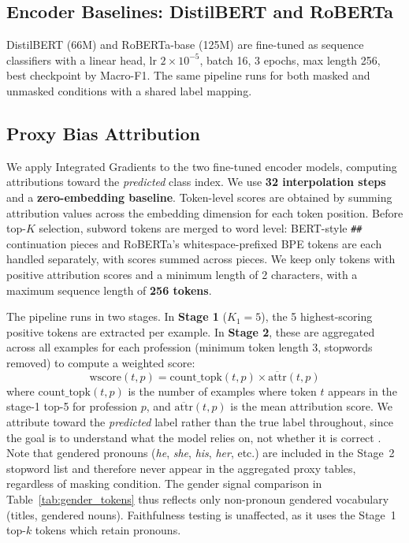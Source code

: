 \documentclass[11pt]{article}
\begin{document}
\subsection{Encoder Baselines: DistilBERT and RoBERTa}
DistilBERT \citep{sanh2019distilbert} (66M) and RoBERTa-base
\citep{liu2019roberta} (125M) are fine-tuned as sequence classifiers
with a linear head, lr $2\!\times\!10^{-5}$, batch 16, 3 epochs,
max length 256, best checkpoint by Macro-F1. The same pipeline runs
for both masked and unmasked conditions with a shared label mapping.

\subsection{Proxy Bias Attribution}
We apply Integrated Gradients \citep{sundararajan2017axiomatic} to the
two fine-tuned encoder models, computing attributions toward the
\emph{predicted} class index.
We use \textbf{32 interpolation steps} and a \textbf{zero-embedding
baseline}. Token-level scores are obtained by summing attribution
values across the embedding dimension for each token position.
Before top-$K$ selection, subword tokens are merged to word level:
BERT-style \texttt{\#\#} continuation pieces and RoBERTa's
whitespace-prefixed BPE tokens are each handled separately, with
scores summed across pieces. We keep only tokens with positive
attribution scores and a minimum length of 2 characters, with a
maximum sequence length of \textbf{256 tokens}.

The pipeline runs in two stages. In \textbf{Stage 1} ($K_1\!=\!5$),
the 5 highest-scoring positive tokens are extracted per example. In
\textbf{Stage 2}, these are aggregated across all examples for each
profession (minimum token length 3, stopwords removed) to compute a
weighted score:
\begin{equation}
  \text{wscore}(t,p) = \text{count\_topk}(t,p) \times \overline{\text{attr}}(t,p)
\end{equation}
where $\text{count\_topk}(t,p)$ is the number of examples where token
$t$ appears in the stage-1 top-5 for profession $p$, and
$\overline{\text{attr}}(t,p)$ is the mean attribution score.
We attribute toward the \emph{predicted} label rather than the true
label throughout, since the goal is to understand what the model relies
on, not whether it is correct \citep{sundararajan2017axiomatic}.
Note that gendered pronouns (\emph{he}, \emph{she}, \emph{his},
\emph{her}, etc.) are included in the Stage~2 stopword list and
therefore never appear in the aggregated proxy tables, regardless of
masking condition. The gender signal comparison in
Table~\ref{tab:gender_tokens} thus reflects only non-pronoun gendered
vocabulary (titles, gendered nouns). Faithfulness testing is unaffected,
as it uses the Stage~1 top-$k$ tokens which retain pronouns.
\end{document}
